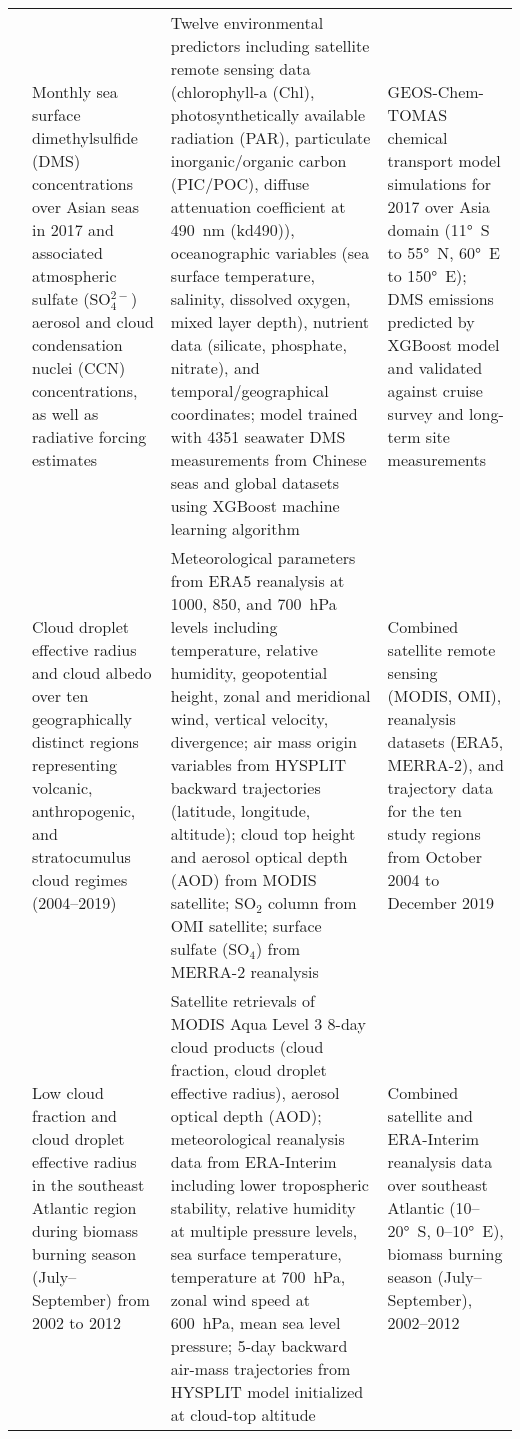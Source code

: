 \documentclass[11pt]{article}
\begin{document}
\begin{landscape}
\begin{longtable}{>{\raggedright\arraybackslash}p{2cm} 
        >{\raggedright\arraybackslash}p{4cm} 
        >{\raggedright\arraybackslash}p{10cm} 
        >{\raggedright\arraybackslash}p{6cm}}
\citet{zhao2022simulating} & Monthly sea surface dimethylsulfide (DMS) concentrations over Asian seas in 2017 and associated atmospheric sulfate (SO$_4^{2-}$) aerosol and cloud condensation nuclei (CCN) concentrations, as well as radiative forcing estimates & Twelve environmental predictors including satellite remote sensing data (chlorophyll-a (Chl), photosynthetically available radiation (PAR), particulate inorganic/organic carbon (PIC/POC), diffuse attenuation coefficient at 490~nm (kd490)), oceanographic variables (sea surface temperature, salinity, dissolved oxygen, mixed layer depth), nutrient data (silicate, phosphate, nitrate), and temporal/geographical coordinates; model trained with 4351 seawater DMS measurements from Chinese seas and global datasets using XGBoost machine learning algorithm & GEOS-Chem-TOMAS chemical transport model simulations for 2017 over Asia domain (11°~S to 55°~N, 60°~E to 150°~E); DMS emissions predicted by XGBoost model and validated against cruise survey and long-term site measurements \\[6pt]

\citet{bender2024machine} & Cloud droplet effective radius and cloud albedo over ten geographically distinct regions representing volcanic, anthropogenic, and stratocumulus cloud regimes (2004–2019) & Meteorological parameters from ERA5 reanalysis at 1000, 850, and 700~hPa levels including temperature, relative humidity, geopotential height, zonal and meridional wind, vertical velocity, divergence; air mass origin variables from HYSPLIT backward trajectories (latitude, longitude, altitude); cloud top height and aerosol optical depth (AOD) from MODIS satellite; SO$_2$ column from OMI satellite; surface sulfate (SO$_4$) from MERRA-2 reanalysis & Combined satellite remote sensing (MODIS, OMI), reanalysis datasets (ERA5, MERRA-2), and trajectory data for the ten study regions from October 2004 to December 2019 \\[6pt]

\citet{fuchs2018building} & Low cloud fraction and cloud droplet effective radius in the southeast Atlantic region during biomass burning season (July–September) from 2002 to 2012 & Satellite retrievals of MODIS Aqua Level 3 8-day cloud products (cloud fraction, cloud droplet effective radius), aerosol optical depth (AOD); meteorological reanalysis data from ERA-Interim including lower tropospheric stability, relative humidity at multiple pressure levels, sea surface temperature, temperature at 700~hPa, zonal wind speed at 600~hPa, mean sea level pressure; 5-day backward air-mass trajectories from HYSPLIT model initialized at cloud-top altitude & Combined satellite and ERA-Interim reanalysis data over southeast Atlantic (10–20°~S, 0–10°~E), biomass burning season (July–September), 2002–2012 \\[6pt]


\end{longtable}
\end{landscape}
\end{document}
